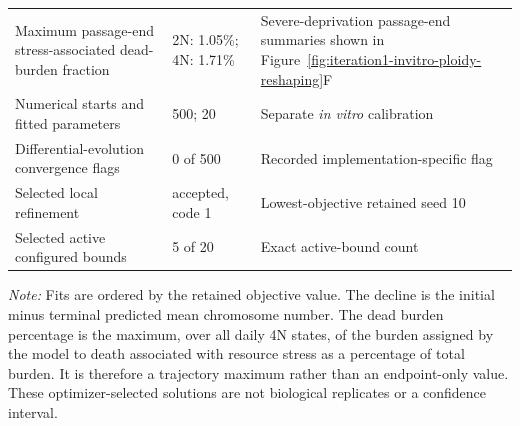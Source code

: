 \begin{table}[!htbp]
\begin{tabular}{@{}p{}p{}p{}@{}}
\midrule
Maximum passage-end stress-associated dead-burden fraction & 2N: 1.05\%; 4N: 1.71\% & Severe-deprivation passage-end summaries shown in Figure~\ref{fig:iteration1-invitro-ploidy-reshaping}F \\
Numerical starts and fitted parameters & 500; 20 & Separate \textit{in vitro} calibration \\
Differential-evolution convergence flags & 0 of 500 & Recorded implementation-specific flag \\
Selected local refinement & accepted, code 1 & Lowest-objective retained seed 10 \\
Selected active configured bounds & 5 of 20 & Exact active-bound count \\
\bottomrule
\end{tabular}
\par\vspace{0.5em}
\begin{minipage}{0.96\textwidth}
\footnotesize
\textit{Note:} Fits are ordered by the retained objective value. The decline is the initial minus terminal predicted mean chromosome number. The dead burden percentage is the maximum, over all daily 4N states, of the burden assigned by the model to death associated with resource stress as a percentage of total burden. It is therefore a trajectory maximum rather than an endpoint-only value. These optimizer-selected solutions are not biological replicates or a confidence interval.
\end{minipage}
\end{table}
